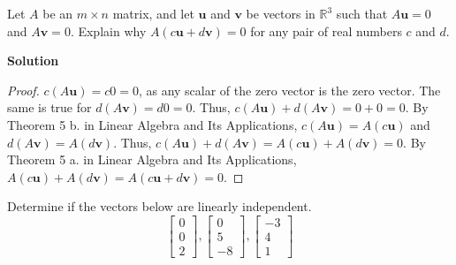\documentclass[11pt]{scrartcl}
\theoremstyle{dotlessP}
\theoremstyle{dotlessN}
\newcommand{\reals}{\mathbb{R}} %
\begin{document}
\begin{ques}
	Let $A$ be an $m \times n$ matrix, and let $\bm{u}$ and $\bm{v}$ be vectors in $\reals^3$ such that $A\bm{u}=0$ and $A\bm{v}=0$. Explain why $A(c\bm{u} + d\bm{v}) = 0$ for any pair of real numbers $c$ and $d$.
\end{ques}
\textbf{Solution}
\begin{proof}
	$c(A\bm{u}) = c 0 = 0$, as any scalar of the zero vector is the zero vector. The same is true for $d(A\bm{v}) = d 0 = 0$. Thus,  $c(A\bm{u}) + d(A\bm{v}) = 0 + 0 = 0$. By Theorem 5 b. in Linear Algebra and Its Applications, $c(A\bm{u}) = A(c\bm{u})$ and $d(A\bm{v}) = A(d\bm{v})$. Thus, $c(A\bm{u}) + d(A\bm{v}) = A(c\bm{u}) + A(d\bm{v}) = 0$. By Theorem 5 a. in Linear Algebra and Its Applications, $A(c\bm{u}) + A(d\bm{v}) = A(c\bm{u} + d\bm{v}) = 0$.
\end{proof}

\begin{ques}
	Determine if the vectors below are linearly independent.
	\[
	\begin{bmatrix}
		0 \\
		0 \\
		2
	\end{bmatrix}, 
	\begin{bmatrix}
		0 \\
		5 \\
		-8
	\end{bmatrix}, 
	\begin{bmatrix}
		-3 \\
		4 \\
		1
	\end{bmatrix}
	\] 
\end{ques}
\end{document}

